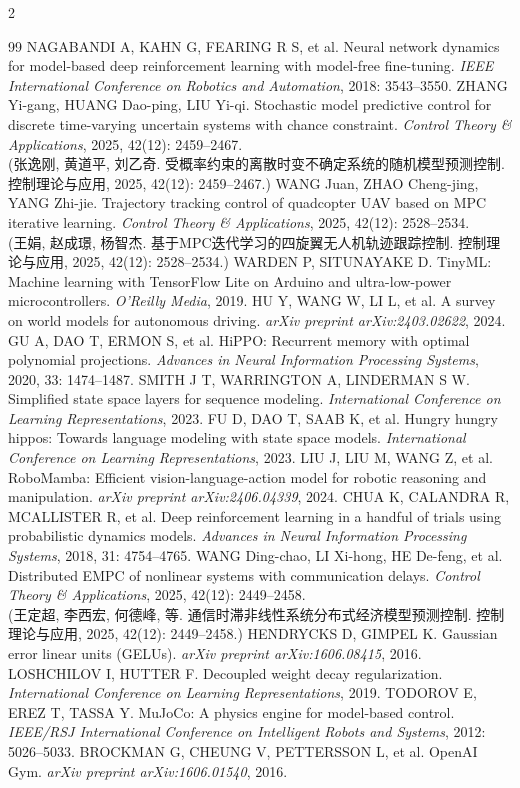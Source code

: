 \begin{multicols}{2}
{\begin{thebibliography}{99}
NAGABANDI A, KAHN G, FEARING R S, et al. Neural network dynamics for model-based deep reinforcement learning with model-free fine-tuning. {\it IEEE International Conference on Robotics and Automation}, 2018: 3543--3550.
ZHANG Yi-gang, HUANG Dao-ping, LIU Yi-qi. Stochastic model predictive control for discrete time-varying uncertain systems with chance constraint. {\it Control Theory \& Applications}, 2025, 42(12): 2459--2467.\\(张逸刚, 黄道平, 刘乙奇. 受概率约束的离散时变不确定系统的随机模型预测控制. 控制理论与应用, 2025, 42(12): 2459--2467.)
WANG Juan, ZHAO Cheng-jing, YANG Zhi-jie. Trajectory tracking control of quadcopter UAV based on MPC iterative learning. {\it Control Theory \& Applications}, 2025, 42(12): 2528--2534.\\(王娟, 赵成璟, 杨智杰. 基于MPC迭代学习的四旋翼无人机轨迹跟踪控制. 控制理论与应用, 2025, 42(12): 2528--2534.)
WARDEN P, SITUNAYAKE D. TinyML: Machine learning with TensorFlow Lite on Arduino and ultra-low-power microcontrollers. {\it O'Reilly Media}, 2019.
HU Y, WANG W, LI L, et al. A survey on world models for autonomous driving. {\it arXiv preprint arXiv:2403.02622}, 2024.
GU A, DAO T, ERMON S, et al. HiPPO: Recurrent memory with optimal polynomial projections. {\it Advances in Neural Information Processing Systems}, 2020, 33: 1474--1487.
SMITH J T, WARRINGTON A, LINDERMAN S W. Simplified state space layers for sequence modeling. {\it International Conference on Learning Representations}, 2023.
FU D, DAO T, SAAB K, et al. Hungry hungry hippos: Towards language modeling with state space models. {\it International Conference on Learning Representations}, 2023.
LIU J, LIU M, WANG Z, et al. RoboMamba: Efficient vision-language-action model for robotic reasoning and manipulation. {\it arXiv preprint arXiv:2406.04339}, 2024.
CHUA K, CALANDRA R, MCALLISTER R, et al. Deep reinforcement learning in a handful of trials using probabilistic dynamics models. {\it Advances in Neural Information Processing Systems}, 2018, 31: 4754--4765.
WANG Ding-chao, LI Xi-hong, HE De-feng, et al. Distributed EMPC of nonlinear systems with communication delays. {\it Control Theory \& Applications}, 2025, 42(12): 2449--2458.\\(王定超, 李西宏, 何德峰, 等. 通信时滞非线性系统分布式经济模型预测控制. 控制理论与应用, 2025, 42(12): 2449--2458.)
HENDRYCKS D, GIMPEL K. Gaussian error linear units (GELUs). {\it arXiv preprint arXiv:1606.08415}, 2016.
LOSHCHILOV I, HUTTER F. Decoupled weight decay regularization. {\it International Conference on Learning Representations}, 2019.
TODOROV E, EREZ T, TASSA Y. MuJoCo: A physics engine for model-based control. {\it IEEE/RSJ International Conference on Intelligent Robots and Systems}, 2012: 5026--5033.
BROCKMAN G, CHEUNG V, PETTERSSON L, et al. OpenAI Gym. {\it arXiv preprint arXiv:1606.01540}, 2016.
\end{thebibliography}}


\end{multicols}
